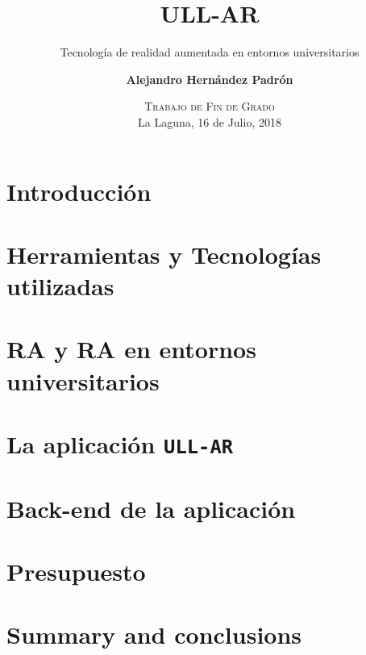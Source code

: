 \documentclass[blue,uncompressed]{beamer}
\title{\textbf{ULL-AR}}
\subtitle{Tecnología de realidad aumentada en entornos universitarios}
\author[Alejandro Hernández Padrón]
{
	\textbf{Alejandro Hernández Padrón}
}
\institute[ULL]
\date[Trabajo de Fin de Grado]{\textsc{Trabajo de Fin de Grado}     \\
                           La Laguna, 16 de Julio, 2018}
\newcommand{\ULLAR}{\texttt{ULL-AR{}}}
\begin{document}
	\begin{frame}[plain]
	\titlepage
	\end{frame}

		\section{Introducción}
			
		\section{Herramientas y Tecnologías utilizadas}
			
		\section{RA y RA en entornos universitarios}
			
		\section{La aplicación \ULLAR}
			
		\section{Back-end de la aplicación}
			
		\section{Presupuesto}	
			
		\section{Summary and conclusions}
			
		
\end{document}
